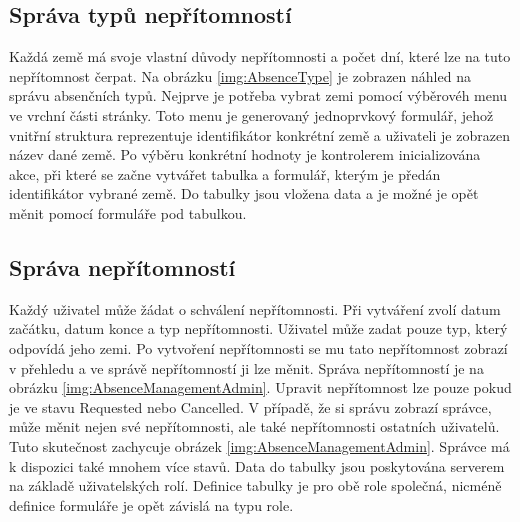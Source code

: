\subsection{Správa typů nepřítomností}
Každá země má svoje vlastní důvody nepřítomnosti a počet dní, které lze na tuto nepřítomnost čerpat. Na obrázku \ref{img:AbsenceType} je zobrazen náhled na správu absenčních typů. Nejprve je potřeba vybrat zemi pomocí výběrovéh menu ve vrchní části stránky. Toto menu je generovaný jednoprvkový formulář,  jehož vnitřní struktura reprezentuje identifikátor konkrétní země a uživateli je zobrazen název dané země. Po výběru konkrétní hodnoty je kontrolerem inicializována akce, při které se začne vytvářet tabulka a formulář, kterým je předán identifikátor vybrané země. Do tabulky jsou vložena data a je možné je opět měnit pomocí formuláře pod tabulkou.
\subsection{Správa nepřítomností}
Každý uživatel může žádat o schválení nepřítomnosti. Při vytváření zvolí datum začátku, datum konce a typ nepřítomnosti. Uživatel může zadat pouze typ, který odpovídá jeho zemi. Po vytvoření nepřítomnosti se mu tato nepřítomnost zobrazí v přehledu a ve správě nepřítomností ji lze měnit. Správa nepřítomností je na obrázku \ref{img:AbsenceManagementAdmin}. Upravit nepřítomnost lze pouze pokud je ve stavu Requested nebo Cancelled. V případě, že si správu zobrazí správce, může měnit nejen své nepřítomnosti, ale také nepřítomnosti ostatních uživatelů. Tuto skutečnost zachycuje obrázek \ref{img:AbsenceManagementAdmin}. Správce má k dispozici také mnohem více stavů. Data do tabulky jsou poskytována serverem na základě uživatelských rolí. Definice tabulky je pro obě role společná, nicméně definice formuláře je opět závislá na typu role. 

